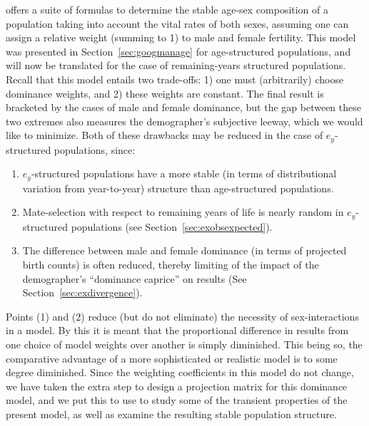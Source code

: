  \FloatBarrier
 \label{sec:ex2sexdomweights}
\citet{goodman1967age} offers a suite of
formulas to determine the stable age-sex composition of a population taking into
account the vital rates of both sexes, assuming one can assign a relative weight
(summing to 1) to male and female fertility. This model was presented in
Section~\ref{sec:googmanage} for age-structured populations, and will now be
translated for the case of remaining-years structured populations. Recall that
this model entails two trade-offs: 1) one must (arbitrarily) choose dominance
weights, and 2) these weights are constant. The final result 
is bracketed by the cases of male and female dominance, but the gap between
these two extremes also measures the demographer's subjective leeway, which we would like to
minimize. Both of these drawbacks may be reduced in the case of $e_y$-structured
populations, since: 
\begin{enumerate}
  \item $e_y$-structured populations have a more stable (in terms of
  distributional variation from year-to-year) structure than age-structured
  populations.
  \item Mate-selection with respect to remaining years of
life is nearly random in $e_y$-structured populations (see
Section~\ref{sec:exobsexpected}).
  \item The difference between male and female dominance (in terms of projected
birth counts) is often reduced, thereby limiting of the impact of the
demographer's ``dominance caprice'' on results (See
Section~\ref{sec:exdivergence}).
\end{enumerate}
Points (1) and (2) reduce (but do
not eliminate) the necessity of sex-interactions in a model. By this it is meant
that the proportional difference in results from one choice of model weights
over another is simply diminished. This being so, the comparative advantage of a
more sophisticated or realistic model is to some degree diminished. Since the
weighting coefficients in this model do not change, we have taken the extra step
to design a projection matrix for this dominance model, and we put this to use
to study some of the transient properties of the present model, as well as
examine the resulting stable population structure.
